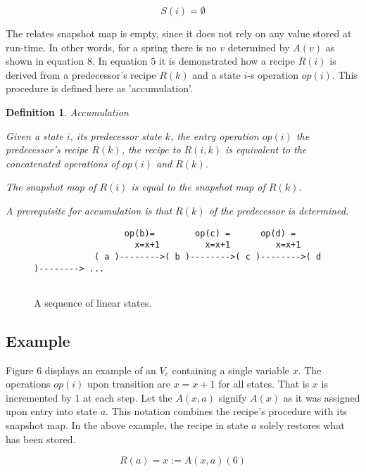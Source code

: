 \documentclass[12pt,a4paper]{scrartcl}
\newtheorem{definition}{Definition}
\begin{document}
\begin{equation}
                          S(i) = \emptyset
\end{equation}

The relates snapshot map is empty, since it does not rely on any value stored
at run-time.  In other words, for a spring there is no $v$ determined by $A(v)$
as shown in equation 8.  In equation 5 it is demonstrated how a recipe $R(i)$
is derived from a predecessor's recipe $R(k)$ and a state $i$-s operation
$op(i)$. This procedure is defined here as 'accumulation'.

\begin{definition}
Accumulation

Given a state $i$, its predecessor state $k$, the entry operation $op(i)$
the predecessor's recipe $R(k)$, the recipe to $R(i,k)$ is equivalent
to the concatenated operations of $op(i)$ and $R(k)$.

The snapshot map of $R(i)$ is equal to the snapshot map of $R(k)$.

A prerequisite for accumulation is that $R(k)$ of the predecessor is 
determined.
\end{definition}

\begin{figure}[htbp] \leavevmode
\begin{verbatim}
                  op(b)=        op(c) =      op(d) =
                    x=x+1         x=x+1         x=x+1        
            ( a )-------->( b )-------->( c )-------->( d )--------> ...


\end{verbatim}
\caption{A sequence of linear states.}
\end{figure}

\subsection{Example}

Figure 6 displays an example of an $V_c$ containing a single variable $x$. The
operations $op(i)$ upon transition are $x=x+1$ for all states. That is $x$ is
incremented by 1 at each step. Let the $A(x,a)$ signify $A(x)$ as it was
assigned upon entry into state $a$. This notation combines the recipe's
procedure with its snapshot map. In the above example, the recipe in state $a$
solely restores what has been stored.

\begin{equation}
\label{eq:}
               R(a) = { x := A(x,a) }                                     (6)
\end{equation}
\end{document}
